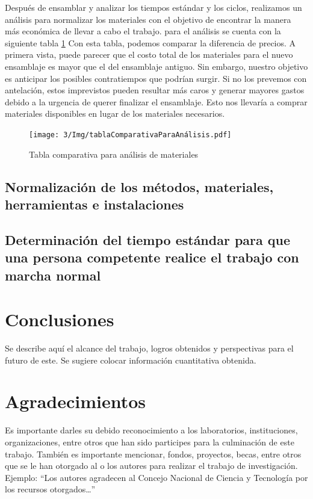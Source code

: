     Después de ensamblar y analizar los tiempos estándar y los ciclos, realizamos un análisis para normalizar los materiales con el objetivo de encontrar la manera más económica de llevar a cabo el trabajo. para el análisis se cuenta con la siguiente tabla \ref{fig:tablaComparativaParaAnálisis}
    Con esta tabla, podemos comparar la diferencia de precios. A primera vista, puede parecer que el costo total de los materiales para el nuevo ensamblaje es mayor que el del ensamblaje antiguo. Sin embargo, nuestro objetivo es anticipar los posibles contratiempos que podrían surgir. Si no los prevemos con antelación, estos imprevistos pueden resultar más caros y generar mayores gastos debido a la urgencia de querer finalizar el ensamblaje. Esto nos llevaría a comprar materiales disponibles en lugar de los materiales necesarios.
    \begin{figure}[H]
        \centering
        \texttt{[image: 3/Img/tablaComparativaParaAnálisis.pdf]}
        \caption{Tabla comparativa para análisis de materiales} 
        \label{fig:tablaComparativaParaAnálisis}
    \end{figure}
    \subsection{Normalización de los métodos, materiales, herramientas e instalaciones}
    
    \subsection{Determinación del tiempo estándar para que una persona competente realice el trabajo con marcha normal}
    
    \section{Conclusiones}
    
    Se describe aquí el alcance del trabajo, logros obtenidos y perspectivas para el futuro de este. Se sugiere colocar información cuantitativa obtenida.
    
    \section{Agradecimientos}
    
    Es importante darles su debido reconocimiento a los laboratorios, instituciones, organizaciones, entre otros que han sido participes para la culminación de este trabajo. También es importante mencionar, fondos, proyectos, becas, entre otros que se le han otorgado al o los autores para realizar el trabajo de investigación. Ejemplo: “Los autores agradecen al Concejo Nacional de Ciencia y Tecnología por los recursos otorgados…”
    
